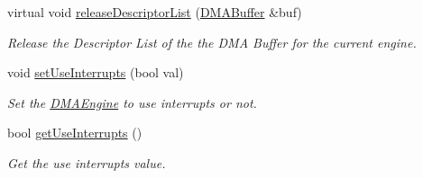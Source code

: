 \begin{CompactItemize}
virtual void \hyperlink{classmprace_1_1DMAEngineWG_a7}{release\-Descriptor\-List} (\hyperlink{classmprace_1_1DMABuffer}{DMABuffer} \&buf)
\begin{CompactList}\small\item\em Release the Descriptor List of the the DMA Buffer for the current engine. \item\end{CompactList}\item 
void \hyperlink{classmprace_1_1DMAEngineWG_a8}{set\-Use\-Interrupts} (bool val)
\begin{CompactList}\small\item\em Set the \hyperlink{classmprace_1_1DMAEngine}{DMAEngine} to use interrupts or not. \item\end{CompactList}\item 
bool \hyperlink{classmprace_1_1DMAEngineWG_a9}{get\-Use\-Interrupts} ()
\begin{CompactList}\small\item\em Get the use interrupts value. \item\end{CompactList}\end{CompactItemize}
